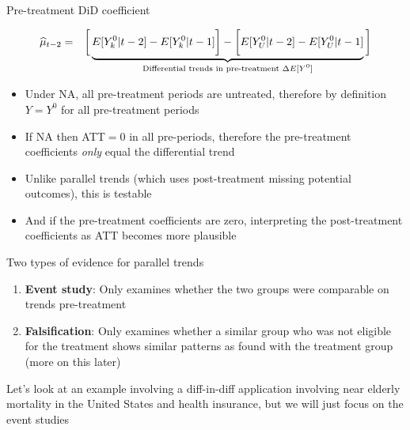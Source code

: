 \documentclass{beamer}
\begin{document}
\begin{frame}{Pre-treatment DiD coefficient}

\begin{eqnarray*}
\widehat{\mu}_{t-2} &=& \bigg [  \underbrace{\textcolor{black}{E[Y^0_k | t-2]} - E[Y^0_k | t-1] \bigg ] - \bigg [ E[Y^0_U | t-2] - E[Y_U^0 | t-1] }_{\mathclap{\text{Differential trends in pre-treatment $\Delta E[Y^0]$}}} \bigg ]
\end{eqnarray*}

\bigskip

\begin{itemize}
\item  Under NA, all pre-treatment periods are untreated, therefore by definition $Y=Y^0$ for all pre-treatment periods
\item If NA then ATT$=$0 in all pre-periods, therefore the pre-treatment coefficients \emph{only} equal the differential trend
\item Unlike parallel trends (which uses post-treatment missing potential outcomes), this is testable
\item And if the pre-treatment coefficients are zero, interpreting the post-treatment coefficients as ATT becomes more plausible

\end{itemize}

\end{frame}


\begin{frame}{Two types of evidence for parallel trends}

\begin{enumerate}
\item \textbf{Event study}: Only examines whether the two groups were comparable on trends pre-treatment
\item \textbf{Falsification}: Only examines whether a similar group who was not eligible for the treatment shows similar patterns as found with the treatment group (more on this later)
\end{enumerate}

\bigskip

Let's look at an example involving a diff-in-diff application involving near elderly mortality in the United States and health insurance, but we will just focus on the event studies

\end{frame}
\end{document}
